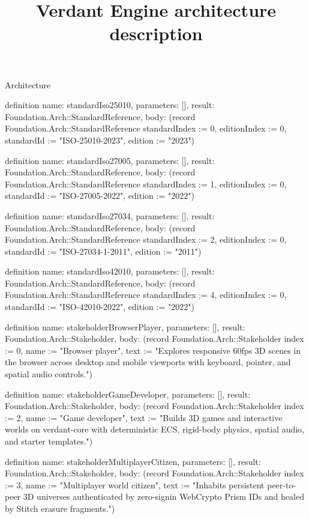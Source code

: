 \begin{lexlean}{Architecture}
\title{Verdant Engine architecture description}
\begin{semanticmodule}
definition{
  name: standardIso25010,
  parameters: [],
  result: Foundation.Arch::StandardReference,
  body: (record Foundation.Arch::StandardReference {standardIndex := 0, editionIndex := 0, standardId := "ISO-25010-2023", edition := "2023"})
}

definition{
  name: standardIso27005,
  parameters: [],
  result: Foundation.Arch::StandardReference,
  body: (record Foundation.Arch::StandardReference {standardIndex := 1, editionIndex := 0, standardId := "ISO-27005-2022", edition := "2022"})
}

definition{
  name: standardIso27034,
  parameters: [],
  result: Foundation.Arch::StandardReference,
  body: (record Foundation.Arch::StandardReference {standardIndex := 2, editionIndex := 0, standardId := "ISO-27034-1-2011", edition := "2011"})
}

definition{
  name: standardIso42010,
  parameters: [],
  result: Foundation.Arch::StandardReference,
  body: (record Foundation.Arch::StandardReference {standardIndex := 4, editionIndex := 0, standardId := "ISO-42010-2022", edition := "2022"})
}

definition{
  name: stakeholderBrowserPlayer,
  parameters: [],
  result: Foundation.Arch::Stakeholder,
  body: (record Foundation.Arch::Stakeholder {index := 0, name := "Browser player", text := "Explores responsive 60fps 3D scenes in the browser across desktop and mobile viewports with keyboard, pointer, and spatial audio controls."})
}

definition{
  name: stakeholderGameDeveloper,
  parameters: [],
  result: Foundation.Arch::Stakeholder,
  body: (record Foundation.Arch::Stakeholder {index := 2, name := "Game developer", text := "Builds 3D games and interactive worlds on verdant-core with deterministic ECS, rigid-body physics, spatial audio, and starter templates."})
}

definition{
  name: stakeholderMultiplayerCitizen,
  parameters: [],
  result: Foundation.Arch::Stakeholder,
  body: (record Foundation.Arch::Stakeholder {index := 3, name := "Multiplayer world citizen", text := "Inhabits persistent peer-to-peer 3D universes authenticated by zero-signin WebCrypto Prism IDs and healed by Stitch erasure fragments."})
}


\end{semanticmodule}
\end{lexlean}
